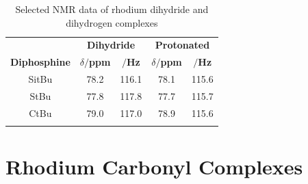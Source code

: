 
\begin{table}[htbp]
\caption[Selected NMR data of rhodium dihydride and dihydrogen complexes]{Selected NMR data of rhodium dihydride and dihydrogen complexes} 
\vspace{1em}
\label{table:dihydrogen}
\small
\begin{center}
\begin{tabular}{ c c c c c}
	\toprule{}
	~~ & \multicolumn{2}{c}{\bfseries{Dihydride}} & \multicolumn{2}{c}{\bfseries{Protonated}}\\
	\bfseries{Diphosphine}&\bfseries{$\delta$\phosphorus{}$/$ppm}&\bfseries{\JRhP$/$Hz}&\bfseries{$\delta$\phosphorus{}$/$ppm}&\bfseries{\JRhP$/$Hz}\\
	\midrule{}
	SitBu	&	78.2	&	116.1	&	78.1		&	115.6\\
	StBu		& 	77.8	&	117.8	&	77.7		&	115.7\\
	CtBu		&	79.0	&	117.0	&	78.9		&	115.6\\
	\bottomrule{}
\end{tabular}
\end{center}
\end{table}


\section{Rhodium Carbonyl Complexes}

